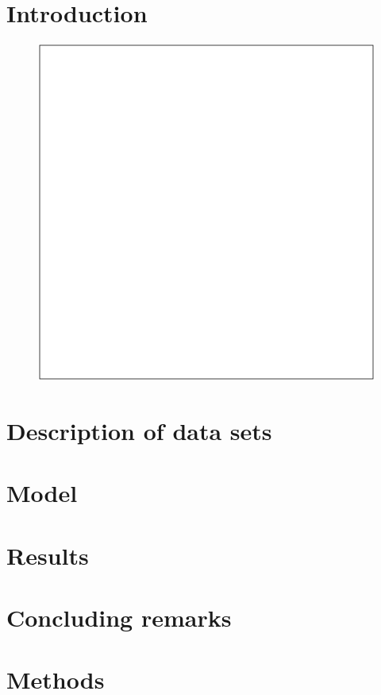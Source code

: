 
\section{Introduction}
\label{sec:papertag.introduction}


\begin{figure}[tp!]
  \centering	
    \includegraphics[width=\columnwidth]{figures/local/null.pdf}  
  \caption{
  }
  \label{fig:papertag.}
\end{figure}

\section{Description of data sets}
\label{sec:papertag.data}


\section{Model}
\label{sec:papertag.model}

\section{Results}
\label{sec:papertag.results}


\section{Concluding remarks}
\label{sec:papertag.concludingremarks}


\section{Methods}
\label{sec:papertag.methods}

